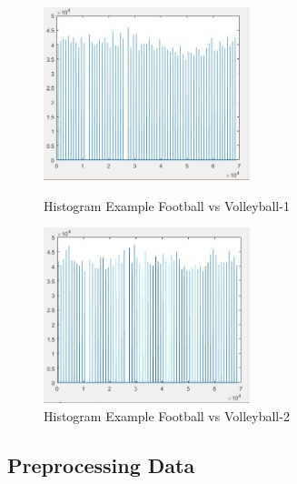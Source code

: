 \documentclass[runningheads,a4paper]{llncs}
\begin{document}
		\begin{figure}[htbp]
		\centering
		\begin{minipage}[t]{0.49\textwidth}
		\centering
		\includegraphics[width=6cm]{footballVolleyball-1.JPG}
		\caption{Histogram Example Football vs Volleyball-1}
		\label{fig:he-7}
		\end{minipage}
		\begin{minipage}[t]{0.49\textwidth}
		\centering
		\includegraphics[width=6cm]{footballVolleyball-2.JPG}
		\caption{Histogram Example Football vs Volleyball-2}
		\label{fig:he-8}
		\end{minipage}
		\end{figure}

\vbox{}
\vbox{}
\vbox{}
\vbox{}
\vbox{}
\vbox{}
\vbox{}
\vbox{}
\vbox{}
\vbox{}
\vbox{}
\vbox{}
\vbox{}
\vbox{}
\vbox{}
	\subsection{Preprocessing Data}
\end{document}
